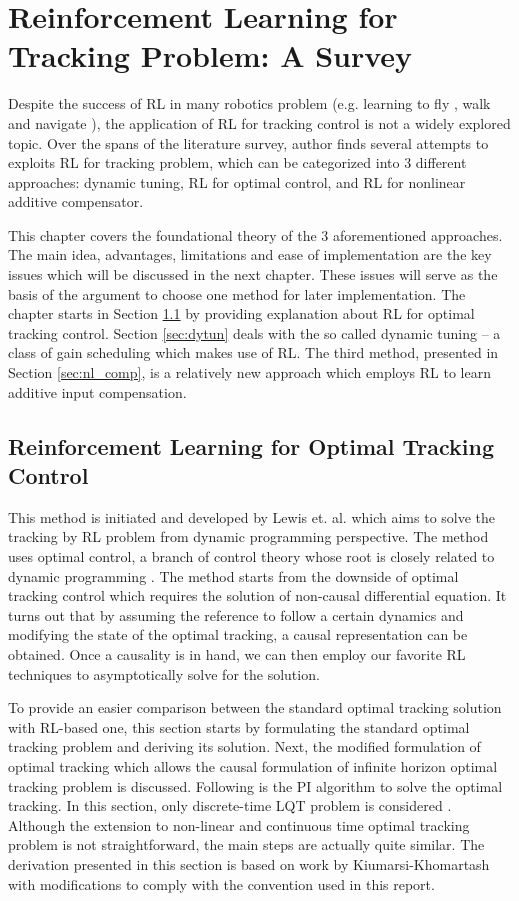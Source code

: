 %
\chapter{Reinforcement Learning for Tracking Problem: A Survey} \label{chap::survey}
Despite the success of \acs{RL} in many robotics problem (e.g. learning to fly \cite{Abbeel}, walk \cite{NIPS2007_3253} and navigate \cite{4543641}), the application of \acs{RL} for tracking control is not a widely explored topic. Over the spans of the literature survey, author finds several attempts to exploits \acs{RL} for tracking problem, which can be categorized into 3 different approaches: dynamic tuning, \acs{RL} for optimal control, and \acs{RL} for nonlinear additive compensator. 

This chapter covers the foundational theory of the 3 aforementioned approaches. The main idea, advantages, limitations and ease of implementation are the key issues which will be discussed in the next chapter. These issues will serve as the basis of the argument to choose one method for later implementation. The chapter starts in Section \ref{sec:rl_lqt} by providing explanation about \acs{RL} for optimal tracking control. Section \ref{sec:dytun} deals with the so called dynamic tuning -- a class of gain scheduling which makes use of \acs{RL}. The third method, presented in Section \ref{sec:nl_comp}, is a relatively new approach which employs \acs{RL} to learn additive input compensation.


\section{Reinforcement Learning for Optimal Tracking Control} \label{sec:rl_lqt}
This method is initiated and developed by Lewis et. al. which aims to solve the tracking by \acs{RL} problem from dynamic programming perspective. The method uses optimal control, a branch of control theory whose root is closely related to dynamic programming \cite{126844}. The method starts from the downside of optimal tracking control which requires the solution of non-causal differential equation. It turns out that by assuming the reference to follow a certain dynamics and modifying the state of the optimal tracking, a causal representation can be obtained. Once a causality is in hand, we can then employ our favorite \acs{RL} techniques to asymptotically solve for the solution. 

To provide an easier comparison between the standard optimal tracking solution with \acs{RL}-based one, this section starts by formulating the standard optimal tracking problem and deriving its solution. Next, the modified formulation of optimal tracking which allows the causal formulation of infinite horizon optimal tracking problem is discussed. Following is the \acs{PI} algorithm to solve the optimal tracking. In this section, only discrete-time \ac{LQT} problem is considered \cite{Kiumarsi6760476}. Although the extension to non-linear and continuous time optimal tracking problem is not straightforward, the main steps are actually quite similar. The derivation presented in this section is based on work by Kiumarsi-Khomartash \cite{Kiumarsi6760476} with modifications to comply with the convention used in this report.

